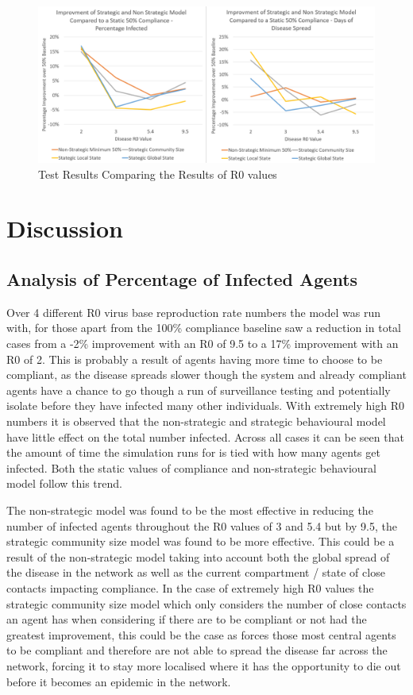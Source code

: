 \documentclass{article}
\begin{document}
\begin{figure}[h!]
\centering
\includegraphics[width=\textwidth]{1}
\caption{Test Results Comparing the Results of R0 values}
\end{figure}
\newpage


\section{Discussion}

\subsection{Analysis of Percentage of Infected Agents}

Over 4 different R0 virus base reproduction rate numbers the model was run with, for those apart from the 100\% compliance baseline saw a reduction in total cases from a -2\% improvement with an R0 of 9.5 to a 17\% improvement with an R0 of 2. This is probably a result of agents having more time to choose to be compliant, as the disease spreads slower though the system and already compliant agents have a chance to go though a run of surveillance testing and potentially isolate before they have infected many other individuals. With extremely high R0 numbers it is observed that the non-strategic and strategic behavioural model have little effect on the total number infected. Across all cases it can be seen that the amount of time the simulation runs for is tied with how many agents get infected. Both the static values of compliance and non-strategic behavioural model follow this trend.\newline 

The non-strategic model was found to be the most effective in reducing the number of infected agents throughout the R0 values of 3 and 5.4 but by 9.5, the strategic community size model was found to be more effective. This could be a result of the non-strategic model taking into account both the global spread of the disease in the network as well as the current compartment / state of close contacts impacting compliance. In the case of extremely high R0 values the strategic community size model which only considers the number of close contacts an agent has when considering if there are to be compliant or not had the greatest improvement, this could be the case as forces those most central agents to be compliant and therefore are not able to spread the disease far across the network, forcing it to stay more localised where it has the opportunity to die out before it becomes an epidemic in the network.\newline 
\end{document}
